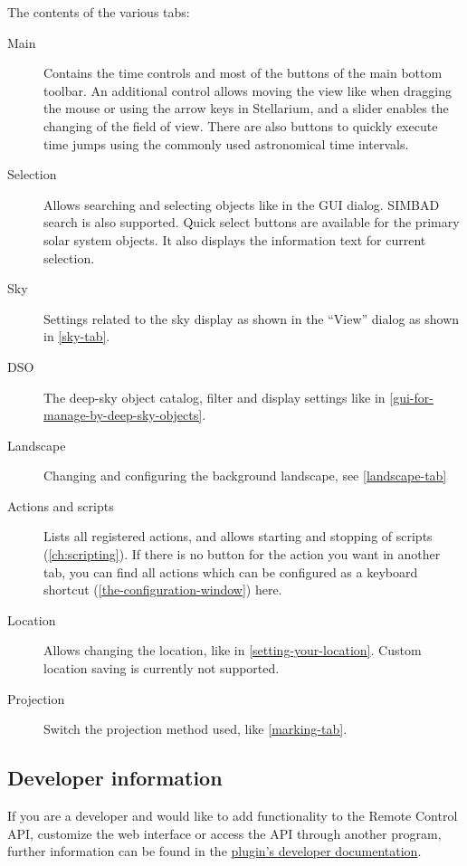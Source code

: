The contents of the various tabs:
\begin{description}
\item[Main] Contains the time controls and most of the buttons of the 
main bottom toolbar. An additional control allows moving the view like when 
dragging the mouse or using the arrow keys in Stellarium, and a slider enables 
the changing of the field of view. There are also buttons to quickly execute 
time jumps using the commonly used astronomical time intervals.
\item[Selection] Allows searching and selecting objects like in the GUI dialog. 
SIMBAD search is also supported. Quick select buttons are available for the 
primary solar system objects. It also displays the information text for current 
selection.
\item[Sky] Settings related to the sky display as shown in the ``View'' dialog 
as shown in \autoref{sky-tab}.
\item[DSO] The deep-sky object catalog, filter and display settings like in 
\autoref{gui-for-manage-by-deep-sky-objects}.
\item[Landscape] Changing and configuring the background landscape, see 
\autoref{landscape-tab}
\item[Actions and scripts] Lists all registered actions, and allows starting 
and stopping of scripts (\autoref{ch:scripting}). If there is no button for the 
action you want in another tab, you can find all actions which can be 
configured as a keyboard shortcut (\autoref{the-configuration-window}) here.
\item[Location] Allows changing the location, like in 
\autoref{setting-your-location}. Custom location saving is currently not 
supported.
\item[Projection] Switch the projection method used, like \autoref{marking-tab}.
\end{description}

\subsection{Developer information}
\label{sec:plugins:RemoteControl:developer}

If you are a developer and would like to add functionality to the Remote 
Control API, customize the web interface or access the API through another 
program, further information can be found in the 
\href{http://stellarium.org/doc-plugins/head/}{plugin's developer 
documentation}.

\newpage
